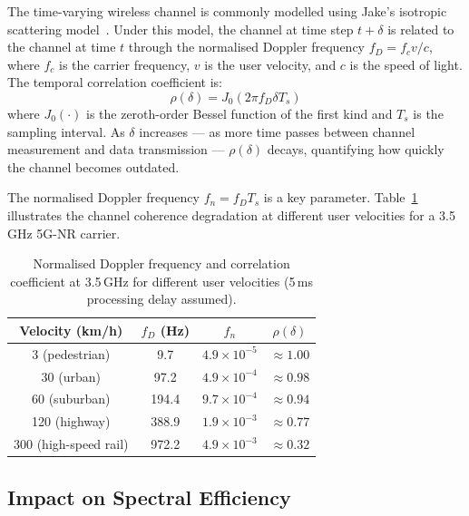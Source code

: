 \documentclass[12pt,a4paper]{article}
\begin{document}
The time-varying wireless channel is commonly modelled using Jake's
isotropic scattering model~\cite{Kim2021kalman}. Under this model, the
channel at time step $t+\delta$ is related to the channel at time $t$
through the normalised Doppler frequency $f_D = f_c v / c$, where $f_c$
is the carrier frequency, $v$ is the user velocity, and $c$ is the speed
of light. The temporal correlation coefficient is:
\begin{equation}
  \rho(\delta) = J_0\!\left(2\pi f_D \delta T_s\right)
\end{equation}
where $J_0(\cdot)$ is the zeroth-order Bessel function of the first kind
and $T_s$ is the sampling interval. As $\delta$ increases --- as more
time passes between channel measurement and data transmission ---
$\rho(\delta)$ decays, quantifying how quickly the channel becomes
outdated.

The normalised Doppler frequency $f_n = f_D T_s$ is a key parameter.
Table~\ref{tab:doppler} illustrates the channel coherence degradation
at different user velocities for a 3.5\,GHz 5G-NR carrier.

\begin{table}[htbp]
  \centering
  \caption{Normalised Doppler frequency and correlation coefficient at
  3.5\,GHz for different user velocities (5\,ms processing delay assumed).}
  \label{tab:doppler}
  \renewcommand{\arraystretch}{1.25}
  \begin{tabular}{cccc}
    \toprule
    \textbf{Velocity (km/h)} & \textbf{$f_D$ (Hz)} & \textbf{$f_n$} & \textbf{$\rho(\delta)$} \\
    \midrule
    3   (pedestrian)   & 9.7   & $4.9\times10^{-5}$ & $\approx 1.00$ \\
    30  (urban)        & 97.2  & $4.9\times10^{-4}$ & $\approx 0.98$ \\
    60  (suburban)     & 194.4 & $9.7\times10^{-4}$ & $\approx 0.94$ \\
    120 (highway)      & 388.9 & $1.9\times10^{-3}$ & $\approx 0.77$ \\
    300 (high-speed rail) & 972.2 & $4.9\times10^{-3}$ & $\approx 0.32$ \\
    \bottomrule
  \end{tabular}
\end{table}

\subsection{Impact on Spectral Efficiency}
\end{document}
